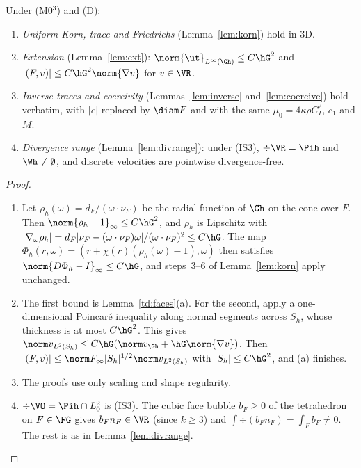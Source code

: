 \begin{lemma}\label{td:tools}
Under (M0$^3$) and (D):
\begin{enumerate}[label=(\alph*)]
\item \emph{Uniform Korn, trace and Friedrichs} (Lemma~\ref{lem:korn}) hold in 3D.
\item \emph{Extension} (Lemma~\ref{lem:ext}): $\norm{\ut}_{L^\infty(\Gh)}\le C\hG^2$ and $|(F,v)|\le C\hG^2\norm{\nabla v}$ for $v\in\VR$.
\item \emph{Inverse traces and coercivity} (Lemmas~\ref{lem:inverse} and~\ref{lem:coercive}) hold verbatim, with $|e|$ replaced by $\diam F$ and with the same $\mu_0=4\kappa\rho C_I^2$, $c_1$ and $M$.
\item \emph{Divergence range} (Lemma~\ref{lem:divrange}): under (IS3), $\div\VR=\Pih$ and $\Wh\ne\emptyset$, and discrete velocities are pointwise divergence-free.
\end{enumerate}
\end{lemma}

\begin{proof}
\begin{enumerate}
\item[(a)] Let $\rho_h(\omega)=d_F/(\omega\cdot\nu_F)$ be the radial function of $\Gh$ on the cone over $F$. Then $\norm{\rho_h-1}_\infty\le C\hG^2$, and $\rho_h$ is Lipschitz with $|\nabla_\omega\rho_h|=d_F|\nu_F-(\omega\cdot\nu_F)\omega|/(\omega\cdot\nu_F)^2\le C\hG$. The map $\Phi_h(r,\omega)=(r+\chi(r)(\rho_h(\omega)-1),\omega)$ then satisfies $\norm{D\Phi_h-I}_\infty\le C\hG$, and steps~3--6 of Lemma~\ref{lem:korn} apply unchanged.
\item[(b)] The first bound is Lemma~\ref{td:faces}(a). For the second, apply a one-dimensional Poincar\'e inequality along normal segments across $S_h$, whose thickness is at most $C\hG^2$. This gives $\norm v_{L^2(S_h)}\le C\hG(\norm v_{\Gh}+\hG\norm{\nabla v})$. Then $|(F,v)|\le\norm F_\infty|S_h|^{1/2}\norm v_{L^2(S_h)}$ with $|S_h|\le C\hG^2$, and (a) finishes.
\item[(c)] The proofs use only scaling and shape regularity.
\item[(d)] $\div\VO=\Pih\cap L^2_0$ is (IS3). The cubic face bubble $b_F\ge0$ of the tetrahedron on $F\in\FG$ gives $b_Fn_F\in\VR$ (since $k\ge3$) and $\int\div(b_Fn_F)=\int_Fb_F\ne0$. The rest is as in Lemma~\ref{lem:divrange}.\qedhere
\end{enumerate}
\end{proof}

